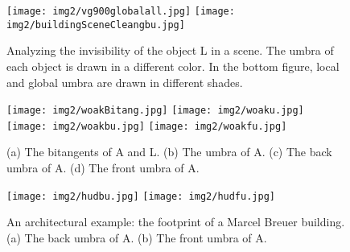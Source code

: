 \documentclass[9pt,twocolumn]{article}
\newif\ifTalk
\begin{document}



\begin{figure}
\begin{center}
\texttt{[image: img2/vg900globalall.jpg]}
\texttt{[image: img2/buildingSceneCleangbu.jpg]}
\end{center}
\caption{Analyzing the invisibility of the object L in a scene.
         The umbra of each object is drawn in 
         a different color.  In the bottom figure, 
	 local and global umbra are drawn in different shades.}
\label{fig:impressive}
\end{figure}

\begin{figure}
\begin{center}
\texttt{[image: img2/woakBitang.jpg]}
\texttt{[image: img2/woaku.jpg]}
\texttt{[image: img2/woakbu.jpg]}
\texttt{[image: img2/woakfu.jpg]}
\end{center}
\caption{(a) The bitangents of A and L. (b) The umbra of A. (c) The back umbra of A. (d) The front umbra of A.}
\label{fig:woakeg}
\end{figure}

\begin{figure}
\begin{center}
\texttt{[image: img2/hudbu.jpg]}
\texttt{[image: img2/hudfu.jpg]}
\end{center}
\caption{An architectural example: the footprint of a Marcel Breuer building. (a) The back umbra of A. (b) The front umbra of A.}
\label{fig:hudeg}
\end{figure}

\ifTalk
  not the Alhambra, the Moorish palace in Granada, Spain.
\fi
\end{document}

